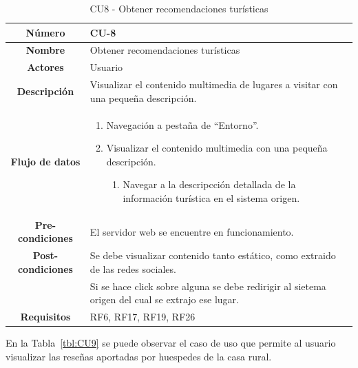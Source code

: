 \begin{table}[h!tb]
	\centering
	\begin{adjustbox}{width=1\textwidth}
	\begin{tabular}{|c|p{\textwidth}|}
		\hline {\bf Número} & CU-8 \\
		\hline {\bf Nombre} & Obtener recomendaciones turísticas\\
		\hline {\bf Actores} & Usuario \\
		\hline {\bf Descripción} & Visualizar el contenido multimedia de lugares a visitar con una pequeña descripción. \\
		\hline {\bf Flujo de datos}
		& 
		\begin{enumerate}
			\item Navegación a pestaña de ``Entorno''.
            \item Visualizar el contenido multimedia con una pequeña descripción.
            \begin{enumerate}
                \item Navegar a la descripcción detallada de la información turística en el sistema origen.
            \end{enumerate}
        \end{enumerate}\\
		\hline {\bf Pre-condiciones}
		& El servidor web se encuentre en funcionamiento. \\
		\hline {\bf Post-condiciones}
		& Se debe visualizar contenido tanto estático, como extraido de las redes sociales. \\
        & Si se hace click sobre alguna se debe redirigir al sietema origen del cual se extrajo ese lugar. \\
    
		\hline {\bf Requisitos} & RF6, RF17, RF19, RF26 \\
		\hline 
	\end{tabular}
	\end{adjustbox}
	\caption{CU8 - Obtener recomendaciones turísticas\label{tbl:CU8}}
\end{table}
En la Tabla~\ref{tbl:CU9} se puede observar el caso de uso que permite al usuario visualizar las reseñas aportadas por huespedes de la casa rural. 
